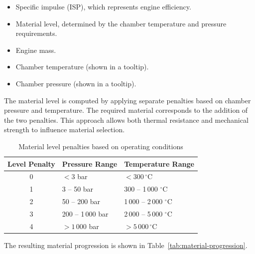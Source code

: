 \documentclass{article}
\begin{document}
\begin{itemize}
    \item Specific impulse (ISP), which represents engine efficiency.
    \item Material level, determined by the chamber temperature and pressure requirements.
    \item Engine mass.
    \item Chamber temperature (shown in a tooltip).
    \item Chamber pressure (shown in a tooltip).
\end{itemize}

The material level is computed by applying separate penalties based on chamber pressure and temperature. The required material corresponds to the addition of the two penalties. This approach allows both thermal resistance and mechanical strength to influence material selection.

\begin{table}[H]
    \centering
    \caption{Material level penalties based on operating conditions}
    \label{tab:material-penalties}
    \begin{tabular}{|c|l|l|}
        \hline
        \textbf{Level Penalty} & \textbf{Pressure Range} & \textbf{Temperature Range} \\
        \hline
        0 & $< 3$ bar & $< 300\,^\circ$C \\
        1 & 3 -- 50 bar & 300 -- 1\,000 $^\circ$C \\
        2 & 50 -- 200 bar & 1\,000 -- 2\,000 $^\circ$C \\
        3 & 200 -- 1\,000 bar & 2\,000 -- 5\,000 $^\circ$C \\
        4 & $> 1\,000$ bar & $> 5\,000\,^\circ$C \\
        \hline
    \end{tabular}
\end{table}

The resulting material progression is shown in Table~\ref{tab:material-progression}.
\end{document}
